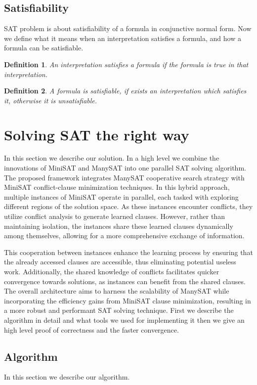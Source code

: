 \documentclass{article}
\newtheorem{definition}{Definition}
\begin{document}
\subsection{Satisfiability}
SAT problem is about satisfiability of a formula in conjunctive normal form. Now we define what it means when an interpretation satisfies a formula, and how a formula can be satisfiable.
\begin{definition}
An interpretation satisfies a formula if the formula is true in that interpretation.
\end{definition}
\begin{definition}
A formula is satisfiable, if exists an interpretation which satisfies it, otherwise it is unsatisfiable.
\end{definition}

\section{Solving SAT the right way}
\label{sec:methodology}

In this section we describe our solution. In a high level we combine the innovations of MiniSAT \cite{MiniSAT} and ManySAT \cite{ManySAT} into one parallel SAT solving algorithm. The proposed framework integrates ManySAT cooperative search strategy with MiniSAT conflict-clause minimization techniques. In this hybrid approach, multiple instances of MiniSAT operate in parallel, each tasked with exploring different regions of the solution space. As these instances encounter conflicts, they utilize conflict analysis to generate learned clauses. However, rather than maintaining isolation, the instances share these learned clauses dynamically among themselves, allowing for a more comprehensive exchange of information.

This cooperation between instances enhance the learning process by ensuring that the already accessed clauses are accessible, thus eliminating potential useless work. Additionally, the shared knowledge of conflicts facilitates quicker convergence towards solutions, as instances can benefit from the shared clauses. The overall architecture aims to harness the scalability of ManySAT while incorporating the efficiency gains from MiniSAT clause minimization, resulting in a more robust and performant SAT solving technique. First we describe the algorithm in detail and what tools we used for implementing it then we give an high level proof of correctness and the faster convergence.

\subsection{Algorithm}
\label{subsec:algorithm}
In this section we describe our algorithm.
\end{document}

